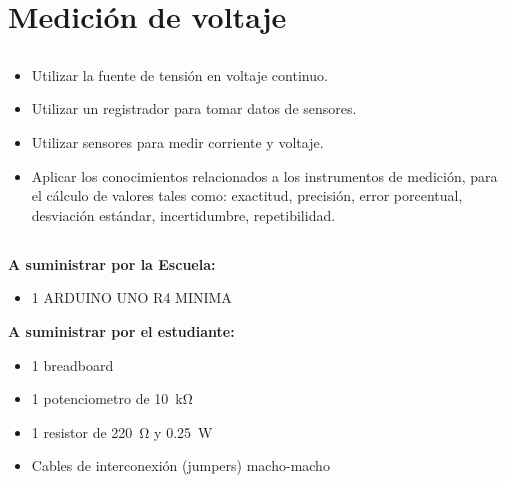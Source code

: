 \chapter{Medición de voltaje}
\section{\obj}
\capacidad
\begin{itemize}
\item Utilizar la fuente de tensión en voltaje continuo.
\item Utilizar un registrador para tomar datos de sensores.
\item Utilizar sensores para medir corriente y voltaje.
\item Aplicar los conocimientos relacionados a los instrumentos de medición, para el cálculo de valores tales como: exactitud, precisión, error porcentual, desviación estándar, incertidumbre, repetibilidad.
\end{itemize}

\section{\mat}
\textbf{A suministrar por la Escuela:}
\begin{itemize}
\item 1 ARDUINO UNO R4 MINIMA

\end{itemize}
\textbf{A suministrar por el estudiante:}
\begin{itemize}
\item 1 breadboard
\item 1 potenciometro de \SI{10}{\kilo\ohm}
\item 1 resistor de \SI{220}{\ohm} y \SI{0.25}{\watt}
\item Cables de interconexión (jumpers) macho-macho
\end{itemize}


